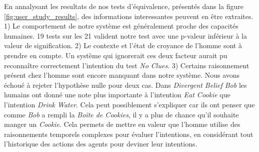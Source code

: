 \documentclass[a4paper,11pt,twoside]{StyleThese}
\begin{document}
En annalysant les resultats de nos tests d'équivalence, présentés dans la figure \ref{fig:user_study_results}, des informations interessantes peuvent en être extraites. 1) Le comportement de notre système est généralement proche des capacités humaines. 19 tests sur les 21 valident notre test avec une p-valeur inférieur à la valeur de signification. 2) Le contexte et l'état de croyance de l'homme sont à prendre en compte. Un système qui ignorerait ces deux facteur aurait pu reconnaître correctement l'intention du test \textit{No Clues}. 3) Certains raisonnement présent chez l'homme sont encore manquant dans notre système. Nous avons échoué à rejeter l'hypothèse nulle pour deux cas. Dans \textit{Divergent Belief Bob} les humains ont donné une note plus importante à l'intention \textit{Eat Cookie} que l'intention \textit{Drink Water}. Cela peut possiblement s'expliquer car ils ont penser que comme \textit{Bob} a rempli la \textit{Boîte de Cookies}, il y a plus de chance qu'il souhaite manger un \textit{Cookie}. Cela permets de mettre en valeur que l'homme utilise des raisonnements temporels complexes pour évaluer l'intentions, en considérant tout l'historique des actions des agents pour deviner leur intentions.
\end{document}
